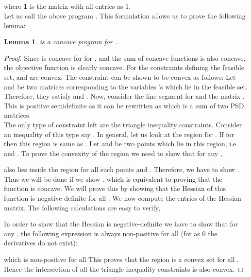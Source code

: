 \documentclass [11pt,a4paper]{article}
\newtheorem{lemma}{Lemma}
\begin{document}
\begin{center}
\\
 \\
 \\
\\

\end{center}
where \textbf{1} is the matrix with all entries as 1. \\
Let us call the above program .
This formulation allows us to prove the following lemma:

\begin{lemma}\label{concave}
 is a concave program for . 
\end{lemma}
\begin{proof}
Since  is concave for  for , and the sum of concave functions
is also concave, the objective function is clearly concave. For the constraints
defining the feasible set,  and 
are convex. The constraint  can be shown to be convex 
as follows: Let  and  be two matrices corresponding to the variables 's
which lie in the feasible set. Therefore, they satisfy  and 
. Now, consider the line segment for 
 and the matrix . This
is positive semidefinite as it can be rewritten as  
which is a sum of two PSD matrices. \\
The only type of constraint left are the triangle inequality constraints. Consider 
an inequality of this type say .  
In general, let us look at the region  for .
If  for  then this region is same as .
Let  and  be two points which lie in this region, i.e. 
 and 
. To prove 
the convexity of the region we need to show that for any ,

also lies inside the region for all such points  and . Therefore, we have to show
.
Thus we will be done if we show 
.
which is equivalent to proving that the function 
is concave. We will prove this by showing that the Hessian of this function is negative-definite for all . We now
compute the entries of the Hessian matrix. The following calculations are easy to verify,


In order to show that the Hessian is negative-definite we have to show that for any ,
the following expression is always non-positive for all  (for  as 0 the derivatives do not exist):

which is non-positive for all 
This proves that the region  is a convex set for all . Hence the 
intersection of all the triangle inequality constraints is also convex.
\end{proof}
\end{document}
